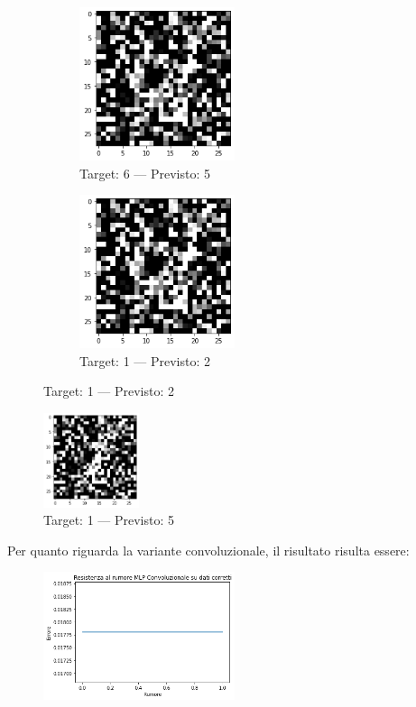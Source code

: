 \documentclass[12pt, a4paper]{article}
\begin{document}
\begin{figure}[H]
    \begin{subfigure}{0.5\textwidth}
        \centering
        \caption{Target: 6 --- Previsto: 5}
        \includegraphics[width=0.5\textwidth]{ErrClass3.png}
    \end{subfigure}
    \begin{subfigure}{0.5\textwidth}
        \centering
        \caption{Target: 1 --- Previsto: 2}
        \includegraphics[width=0.5\textwidth]{ErrClass4.png}
    \end{subfigure}
\end{figure}

\begin{figure}[H]
    \centering
    \caption{Target: 1 --- Previsto: 5}
    \includegraphics[width=0.25\textwidth]{ErrClass5.png}
\end{figure}

Per quanto riguarda la variante convoluzionale, il risultato risulta essere:
\begin{figure}[H]
    \centering
    \includegraphics[width=0.50\textwidth]{TPConv.png}
\end{figure}
\end{document}

